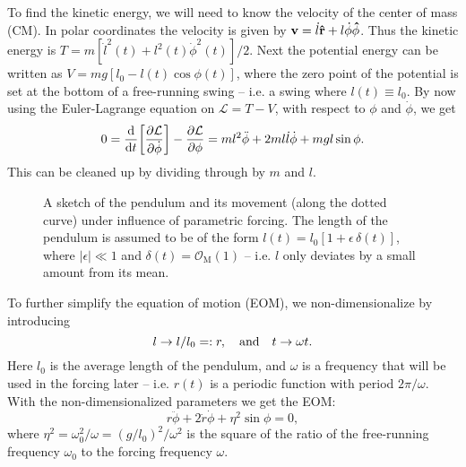 To find the kinetic energy, we will need to know the velocity of the
center of mass (CM). 
In polar coordinates the velocity is given by
$\vb{v}=\dot{l}\vu{r}+l\dot{\phi}\vu{\phi}$. Thus the kinetic energy is
$T=m[\dot{l}^2(t)+l^2(t)\dot{\phi}^2(t)]/2$.
Next the potential energy can be written as
$V=mg[l_0-l(t)\cos\phi(t)]$,
where the zero point of the potential is set at the bottom of a
free-running swing -- i.e. a swing where $l(t)\equiv l_0$. 
By now using the Euler-Lagrange equation on $\mathcal{L}=T-V$, with
 respect to $\phi$ and $\dot\phi$, we get
\begin{equation}
0=\dv{t}\qty[\pdv{\mathcal{L}}{\dot{\phi}}]-\pdv{\mathcal{L}}{\phi}
=ml^2\ddot\phi +2ml\dot{l}\dot\phi +mgl\sin\phi.
\end{equation}
This can be cleaned up by dividing through by $m$ and $l$. 

\begin{figure}\centering
\resizebox{.2\textwidth}{!}{}
\caption{A sketch of the pendulum and its movement (along the dotted
  curve) under influence of parametric forcing. The length of the
  pendulum is assumed to be of the form
  $l(t)=l_0[1+\epsilon\,\delta(t)]$, where $|\epsilon|\ll1$ and
  $\delta(t)=\mathcal{O}_\text{M}(1)$  -- i.e. $l$ only deviates by a
  small amount from its mean.  
}
\label{fig:pendulum}
\end{figure}



To further simplify the equation of motion (EOM), we
non-dimensionalize by introducing
\begin{equation}\label{eq:non-dim}
l\to {l}/{l_0}=:r\qcomma\text{and}\quad
t\to\omega t.
\end{equation}
Here $l_0$ is the average length of the pendulum, and $\omega$ is a
frequency that will be used in the forcing later -- i.e. $r(t)$ is a
periodic function with period $2\pi/\omega$. 
With the non-dimensionalized parameters we get the EOM:
\begin{equation}\label{eq:eom}
r\ddot\phi+2\dot{r}\dot\phi + \eta^2\sin\phi=0,
\end{equation}
where %
$\eta^2=\omega_0^2/\omega=(g/l_0)^2/\omega^2$ is the square of the
ratio of the free-running frequency $\omega_0$ to the forcing
frequency $\omega$. 



